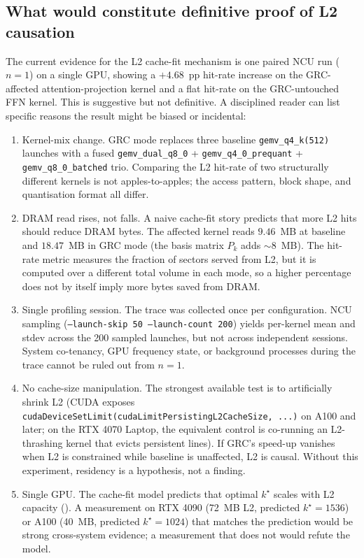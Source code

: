 \documentclass[11pt]{article}
\begin{document}
\subsection{What would constitute definitive proof of L2 causation}
\label{sec:falsification}

The current evidence for the L2 cache-fit mechanism is one paired NCU run
($n{=}1$) on a single GPU, showing a $+4.68$~pp hit-rate increase on the
GRC-affected attention-projection kernel and a flat hit-rate on the
GRC-untouched FFN kernel. This is suggestive but not definitive. A
disciplined reader can list specific reasons the result might be biased
or incidental:

\begin{enumerate}
\item Kernel-mix change. GRC mode replaces three baseline
\texttt{gemv\_q4\_k(512)} launches with a fused
\texttt{gemv\_dual\_q8\_0} + \texttt{gemv\_q4\_0\_prequant} +
\texttt{gemv\_q8\_0\_batched} trio. Comparing the L2 hit-rate of two
structurally different kernels is not apples-to-apples; the access
pattern, block shape, and quantisation format all differ.
\item DRAM read rises, not falls. A naive cache-fit story
predicts that more L2 hits should reduce DRAM bytes. The affected
kernel reads $9.46$~MB at baseline and $18.47$~MB in GRC mode (the
basis matrix $P_k$ adds ${\sim}8$~MB). The hit-rate metric measures the
fraction of sectors served from L2, but it is computed over a different
total volume in each mode, so a higher percentage does not by itself
imply more bytes saved from DRAM.
\item Single profiling session. The trace was collected once
per configuration. NCU sampling (\texttt{--launch-skip 50 --launch-count 200})
yields per-kernel mean and stdev across the 200 sampled launches, but
not across independent sessions. System co-tenancy, GPU frequency
state, or background processes during the trace cannot be ruled out from
$n{=}1$.
\item No cache-size manipulation. The strongest available test
is to artificially shrink L2 (CUDA exposes
\texttt{cudaDeviceSetLimit(cudaLimitPersistingL2CacheSize, ...)} on
A100 and later; on the RTX 4070 Laptop, the equivalent control is
co-running an L2-thrashing kernel that evicts persistent lines). If
GRC's speed-up vanishes when L2 is constrained while baseline is
unaffected, L2 is causal. Without this experiment, residency is a
hypothesis, not a finding.
\item Single GPU. The cache-fit model predicts that optimal
$k^\star$ scales with L2 capacity (). A measurement
on RTX 4090 (72~MB L2, predicted $k^\star{=}1536$) or A100 (40~MB,
predicted $k^\star{=}1024$) that matches the prediction would be strong
cross-system evidence; a measurement that does not would refute the
model.
\end{enumerate}
\end{document}
